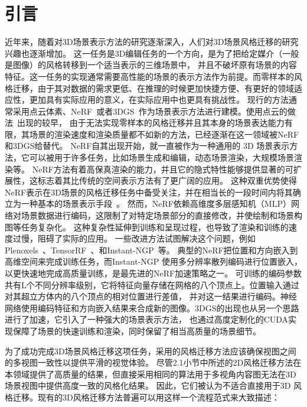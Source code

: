 \section{引言}
近年来，随着对3D场景表示方法的研究逐渐深入，人们对3D场景风格迁移的研究兴趣也逐渐增加。
这一任务是3D编辑任务的一个方向，是为了把给定媒介（一般是图像）的风格转移到一个适当表示的三维场景中，
并且不破坏原有场景的内容特征。这一任务的实现通常需要高性能的场景的表示方法作为前提。而零样本的风格迁移，由于其对数据的需求更低、在推理的时候更加快捷方便、有更好的领域适应性，更加具有实际应用的意义，在实际应用中也更具有挑战性。
现行的方法通常采用点云体素、NeRF~\cite{mildenhall2021nerf}或者3DGS~\cite{kerbl20233d}作为场景表示方法进行建模。使用点云的做法~\cite{huang2021learning,mu20223d,yin20213dstylenet}出现的较早，
由于无法实现零样本的风格迁移并且其本身的场景表达能力有限，其场景的渲染速度和渲染质量都不如新的方法，已经逐渐在这一领域被NeRF和3DGS给替代。
NeRF自其出现开始，就一直被作为一种通用的 3D 场景表示方法，它可以被用于许多任务，比如场景生成和编辑，动态场景渲染，大规模场景渲染等。
NeRF方法有着高保真渲染的能力，并且它的隐式特性能够提供显著的可扩展性，这标志着其比传统的空间表示方法有了更广阔的应用。
这种双重优势使得NeRF表示在3D场景的风格迁移任务中备受关注，并在相当长的一段时间内将其确立为一种基本的场景表示手段~\cite{zhang2022arf,chiang2022stylizing,li2023instant,chen2024upst,liu2023stylerf}。
然而，NeRF依赖高维度多层感知机（MLP）网络对场景数据进行编码，这限制了对特定场景部分的直接修改，并使绘制和场景构图等任务复杂化。
这种复杂性延伸到训练和呈现过程，也导致了渲染和训练的速度过慢，阻碍了实际的应用。
一些改进方法试图解决这个问题，例如 Plenoxels~\cite{fridovich2022plenoxels}、TensorRF~\cite{chen2022tensorf}、和Instant-NGP~\cite{muller2022instant}等。
典型的NeRF把位置和方向嵌入到高维空间来完成训练任务，而Instant-NGP 使用多分辨率散列编码进行位置嵌入，以更快速地完成高质量训练，是最先进的NeRF加速策略之一。
可训练的编码参数共有L个不同分辨率级别，它将特征向量存储在网格的八个顶点上。位置输入通过对其超立方体内的八个顶点的相对位置进行差值，
并对这一结果进行编码。神经网络使用编码特征和方向嵌入结果来合成新的图像。3DGS的出现也从另一个思路进行了加速，它引入了一种强大的场景表示方法，
也通过高度定制化的CUDA实现保障了场景的快速训练和渲染，同时保留了相当高质量的场景细节。
\par 为了成功完成3D场景风格迁移这项任务，采用的风格迁移方法应该确保视图之间的多视图一致性以提供平滑的视觉体验。
尽管2.1小节中所述的2D风格迁移方法在本领域提供了高质量的结果，但直接采用相同的算法用于多视角内容图无法在3D场景视图中提供高度一致的风格化结果。
因此，它们被认为不适合直接用于3D 风格迁移。现有的3D风格迁移方法普遍可以用这样一个流程范式来大致描述：
